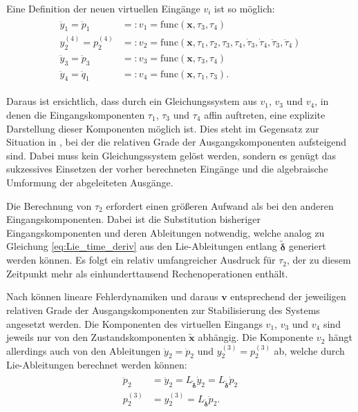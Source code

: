 Eine Definition der neuen virtuellen Eingänge $v_i$ ist so möglich:
\begin{align}
\begin{split}
	\ddot{y}_1 = \ddot{p}_1 &=: v_1 = \mathrm{func}(\mathbf{x}, \tau_3, \tau_4) \\
	y_2^{(4)} = p_2^{(4)} &=: v_2 = \mathrm{func}(\mathbf{x}, \tau_1, \tau_2, \tau_3, \tau_4, \dot{\tau}_3, \dot{\tau}_4, \ddot{\tau}_3, \ddot{\tau}_4) \\
	\ddot{y}_3 = \ddot{p}_3 &=: v_3 = \mathrm{func}(\mathbf{x}, \tau_3, \tau_4) \\
	\ddot{y}_4 = \ddot{q}_1 &=: v_4 = \mathrm{func}(\mathbf{x}, \tau_1, \tau_3) .
\end{split}
\end{align}

Daraus ist ersichtlich, dass durch ein Gleichungssystem aus $v_1$, $v_3$ und $v_4$, in denen die Eingangskomponenten $\tau_1$, $\tau_3$ und $\tau_4$ affin auftreten, eine explizite Darstellung dieser Komponenten möglich ist. Dies steht im Gegensatz zur Situation in \cite[S. 207]{NLRT_Roebenack}, bei der die relativen Grade der Ausgangskomponenten aufsteigend sind. Dabei muss kein Gleichungssystem gelöst werden, sondern es genügt das sukzessives Einsetzen der vorher berechneten Eingänge und die algebraische Umformung der abgeleiteten Ausgänge.
 
Die Berechnung von $\tau_2$ erfordert einen größeren Aufwand als bei den anderen Eingangskomponenten. Dabei ist die Substitution bisheriger Eingangskomponenten und deren Ableitungen notwendig, welche analog zu Gleichung \eqref{eq:Lie_time_deriv} aus den Lie-Ableitungen entlang $\tilde{\boldsymbol{\delta}}$ generiert werden können. Es folgt ein relativ umfangreicher Ausdruck für $\tau_2$, der zu diesem Zeitpunkt mehr als einhunderttausend Rechenoperationen enthält.

Nach \cite[S. 208]{NLRT_Roebenack} können lineare Fehlerdynamiken und daraus $\mathbf{v}$ entsprechend der jeweiligen relativen Grade der Ausgangskomponenten zur Stabilisierung des Systems angesetzt werden. Die Komponenten des virtuellen Eingangs $v_1$, $v_3$ und $v_4$ sind jeweils nur von den Zustandskomponenten $\tilde{\mathbf{x}}$ abhängig. Die Komponente $v_2$ hängt allerdings auch von den Ableitungen $\ddot{y}_2 = \ddot{p}_2$ und $y_2^{(3)} = p_2^{(3)}$ ab, welche durch Lie-Ableitungen berechnet werden können:
\begin{align}
	\label{eq:p2_derivs_Lie}
	\begin{split}
		\ddot{p}_2 &= \ddot{y}_2 = L_{\tilde{\boldsymbol{\delta}}} \dot{y}_2 = L_{\tilde{\boldsymbol{\delta}}} \dot{p}_2 \\
		p_2^{(3)} &= y_2^{(3)} = L_{\tilde{\boldsymbol{\delta}}} \ddot{p}_2.
	\end{split}
\end{align}

